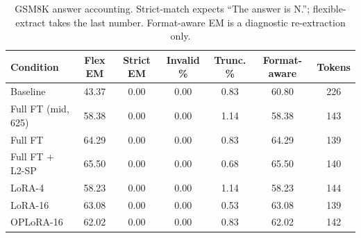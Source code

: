 \begin{table}[t]
\centering
\small
\caption{GSM8K answer accounting. Strict-match expects ``The answer is N.''; flexible-extract takes the last number. Format-aware EM is a diagnostic re-extraction only.}
\label{tab:t1_gsm}
\begin{tabular}{lcccccc}
\toprule
Condition & Flex EM & Strict EM & Invalid \% & Trunc. \% & Format-aware & Tokens \\
\midrule
Baseline & 43.37 & 0.00 & 0.00 & 0.83 & 60.80 & 226 \\
Full FT (mid, 625) & 58.38 & 0.00 & 0.00 & 1.14 & 58.38 & 143 \\
Full FT & 64.29 & 0.00 & 0.00 & 0.83 & 64.29 & 139 \\
Full FT + L2-SP & 65.50 & 0.00 & 0.00 & 0.68 & 65.50 & 140 \\
LoRA-4 & 58.23 & 0.00 & 0.00 & 1.14 & 58.23 & 144 \\
LoRA-16 & 63.08 & 0.00 & 0.00 & 0.53 & 63.08 & 139 \\
OPLoRA-16 & 62.02 & 0.00 & 0.00 & 0.83 & 62.02 & 142 \\
\bottomrule
\end{tabular}
\end{table}
